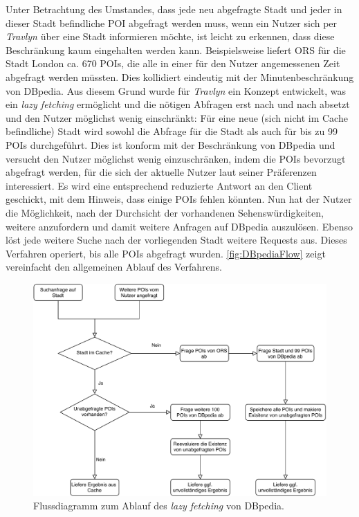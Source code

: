 	Unter Betrachtung des Umstandes, dass jede neu abgefragte Stadt und jeder in dieser Stadt befindliche \acs{POI} abgefragt werden muss, wenn ein Nutzer sich per \textit{Travlyn} über eine Stadt informieren möchte, ist leicht zu erkennen, dass diese Beschränkung kaum eingehalten werden kann. Beispielsweise liefert \acs{ORS} für die Stadt London ca. 670 \acs{POI}s, die alle in einer für den Nutzer angemessenen Zeit abgefragt werden müssten. Dies kollidiert eindeutig mit der Minutenbeschränkung von DBpedia.
	Aus diesem Grund wurde für \textit{Travlyn} ein Konzept entwickelt, was ein \textit{lazy fetching} ermöglicht und die nötigen Abfragen erst nach und nach absetzt und den Nutzer möglichst wenig einschränkt:
	Für eine neue (sich nicht im Cache befindliche) Stadt wird sowohl die Abfrage für die Stadt als auch für bis zu 99 \acs{POI}s durchgeführt. Dies ist konform mit der Beschränkung von DBpedia und versucht den Nutzer möglichst wenig einzuschränken, indem die \acs{POI}s bevorzugt abgefragt werden, für die sich der aktuelle Nutzer laut seiner Präferenzen interessiert. Es wird eine entsprechend reduzierte Antwort an den Client geschickt, mit dem Hinweis, dass einige \acs{POI}s fehlen könnten. Nun hat der Nutzer die Möglichkeit, nach der Durchsicht der vorhandenen Sehenswürdigkeiten, weitere anzufordern und damit weitere Anfragen auf DBpedia auszulösen. Ebenso löst jede weitere Suche nach der vorliegenden Stadt weitere Requests aus. Dieses Verfahren operiert, bis alle \acs{POI}s abgefragt wurden. \autoref{fig:DBpediaFlow} zeigt vereinfacht den allgemeinen Ablauf des Verfahrens.
	
	\begin{figure}[ht!]
		\centering
		\includegraphics[width=1\textwidth]{images/DBpediaFlow.pdf}
		\caption{Flussdiagramm zum Ablauf des \textit{lazy fetching} von DBpedia.}
		\label{fig:DBpediaFlow}
	\end{figure}

